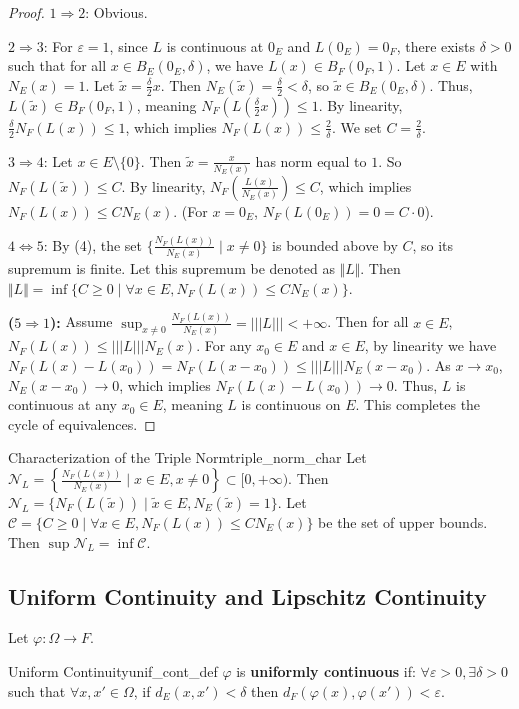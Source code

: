 \documentclass[11pt, a4paper]{article}
\newcommand{\eps}{\varepsilon}
\begin{document}
\begin{proof}
$1 \Rightarrow 2$: Obvious.

$2 \Rightarrow 3$: For $\eps = 1$, since $L$ is continuous at $0_E$ and $L(0_E) = 0_F$, there exists $\delta > 0$ such that for all $x \in B_E(0_E, \delta)$, we have $L(x) \in B_F(0_F, 1)$.
Let $x \in E$ with $N_E(x) = 1$. Let $\tilde{x} = \frac{\delta}{2}x$. Then $N_E(\tilde{x}) = \frac{\delta}{2} < \delta$, so $\tilde{x} \in B_E(0_E, \delta)$.
Thus, $L(\tilde{x}) \in B_F(0_F, 1)$, meaning $N_F(L(\frac{\delta}{2}x)) \le 1$.
By linearity, $\frac{\delta}{2}N_F(L(x)) \le 1$, which implies $N_F(L(x)) \le \frac{2}{\delta}$. We set $C = \frac{2}{\delta}$.

$3 \Rightarrow 4$: Let $x \in E \setminus \{0\}$. Then $\tilde{x} = \frac{x}{N_E(x)}$ has norm equal to $1$.
So $N_F(L(\tilde{x})) \le C$.
By linearity, $N_F\left(\frac{L(x)}{N_E(x)}\right) \le C$, which implies $N_F(L(x)) \le C N_E(x)$.
(For $x = 0_E$, $N_F(L(0_E)) = 0 = C \cdot 0$).

$4 \Leftrightarrow 5$: By (4), the set $\{\frac{N_F(L(x))}{N_E(x)} \mid x \neq 0\}$ is bounded above by $C$, so its supremum is finite. Let this supremum be denoted as $\Vert L \Vert$.
Then $\Vert L \Vert = \inf\{C \ge 0 \mid \forall x \in E, N_F(L(x)) \le C N_E(x)\}$.

\textbf{($5 \Rightarrow 1$):} Assume $\sup_{x \neq 0} \frac{N_F(L(x))}{N_E(x)} = |||L||| < +\infty$. Then for all $x \in E$, $N_F(L(x)) \le |||L||| N_E(x)$. For any $x_0 \in E$ and $x \in E$, by linearity we have $N_F(L(x) - L(x_0)) = N_F(L(x - x_0)) \le |||L||| N_E(x - x_0)$. As $x \to x_0$, $N_E(x - x_0) \to 0$, which implies $N_F(L(x) - L(x_0)) \to 0$. Thus, $L$ is continuous at any $x_0 \in E$, meaning $L$ is continuous on $E$. This completes the cycle of equivalences.
\end{proof}

\begin{proposition}{Characterization of the Triple Norm}{triple_norm_char}
Let $\mathcal{N}_L = \left\{ \frac{N_F(L(x))}{N_E(x)} \mid x \in E, x \neq 0 \right\} \subset [0, +\infty)$.
Then $\mathcal{N}_L = \{ N_F(L(\tilde{x})) \mid \tilde{x} \in E, N_E(\tilde{x}) = 1 \}$.
Let $\mathcal{C} = \{ C \ge 0 \mid \forall x \in E, N_F(L(x)) \le C N_E(x) \}$ be the set of upper bounds.
Then $\sup \mathcal{N}_L = \inf \mathcal{C}$.
\end{proposition}

\subsection{Uniform Continuity and Lipschitz Continuity}
Let $\varphi: \Omega \to F$.
\begin{definition}{Uniform Continuity}{unif_cont_def}
$\varphi$ is \textbf{uniformly continuous} if:
$\forall \eps > 0, \exists \delta > 0$ such that $\forall x, x' \in \Omega$, if $d_E(x, x') < \delta$ then $d_F(\varphi(x), \varphi(x')) < \eps$.
\end{definition}
\end{document}
